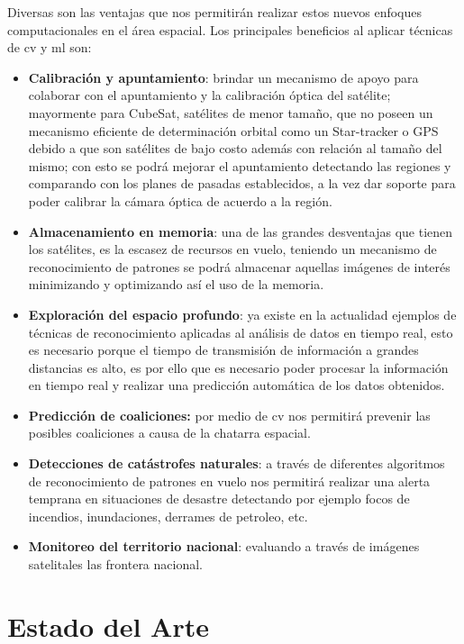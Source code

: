 Diversas son las ventajas que nos permitirán realizar estos nuevos enfoques computacionales en el área espacial. Los principales beneficios al aplicar técnicas de \ac{cv} y \ac{ml} son: 
\begin{itemize}
\item \textbf{Calibración y apuntamiento}: brindar un mecanismo de apoyo para colaborar con el apuntamiento y la calibración óptica del satélite; mayormente para CubeSat, satélites de menor tamaño, que no poseen un mecanismo eficiente de determinación orbital como un Star-tracker o GPS debido a que son satélites de bajo costo además con relación al tamaño del mismo; con esto se podrá mejorar el apuntamiento detectando las regiones y comparando con los planes de pasadas  establecidos, a la vez dar soporte para poder calibrar la cámara óptica de acuerdo a la región.
\item \textbf{Almacenamiento en memoria}: una de las grandes desventajas que tienen los satélites, es la escasez de recursos en vuelo, teniendo un mecanismo de reconocimiento de patrones se podrá almacenar aquellas imágenes de interés minimizando y optimizando  así el uso de la memoria.
\item \textbf{Exploración del espacio profundo}: ya existe en la actualidad ejemplos de técnicas de reconocimiento aplicadas al análisis de datos en tiempo real, esto es necesario  porque el tiempo de transmisión de información a grandes distancias es alto, es por ello que es necesario poder procesar la información en tiempo real y realizar una predicción automática de los datos obtenidos.
\item \textbf{Predicción de coaliciones:} por medio de \ac{cv} nos permitirá prevenir las posibles coaliciones a causa de la chatarra espacial. 
\item \textbf{Detecciones de catástrofes naturales}: a través de diferentes algoritmos de reconocimiento de patrones en vuelo nos permitirá realizar una alerta temprana en situaciones de desastre detectando por ejemplo focos de incendios, inundaciones, derrames de petroleo, etc.
\item \textbf{Monitoreo del territorio nacional}: evaluando a través de imágenes satelitales las frontera nacional.
\end{itemize}

\section{Estado del Arte} \label{sec:estadodelarte}

